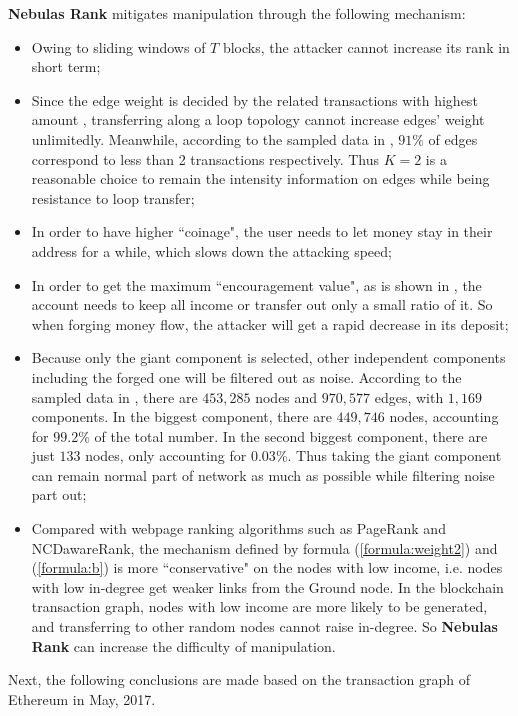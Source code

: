 \textbf{Nebulas Rank} mitigates manipulation through the following mechanism:
\begin{itemize}
	\item Owing to sliding windows of $T$ blocks, the attacker cannot increase its rank in short term;
	\item Since the edge weight is decided by the related transactions with highest amount , transferring along a loop topology cannot increase edges' weight unlimitedly. Meanwhile, according to the sampled data in , $91\%$ of edges correspond to less than 2 transactions respectively. Thus $K=2$ is a reasonable choice to remain the intensity information on edges while being resistance to loop transfer;
	\item In order to have higher ``coinage", the user needs to let money stay in their address for a while, which slows down the attacking speed;
	\item In order to get the maximum ``encouragement value", as is shown in , the account needs to keep all income or transfer out only a small ratio of it. So when forging money flow, the attacker will get a rapid decrease in its deposit;
	\item Because only the giant component is selected, other independent components including the forged one will be filtered out as noise. According to the sampled data in , there are $453,285$ nodes and $970,577$ edges, with $1,169$ components. In the biggest component, there are $449,746$ nodes, accounting for $99.2\%$ of the total number. In the second biggest component, there are just $133$ nodes, only accounting for $0.03\%$. Thus taking the giant component can remain normal part of network as much as possible while filtering noise part out;
	\item Compared with webpage ranking algorithms such as PageRank and NCDawareRank\cite{Nikolakopoulos2013}, the mechanism defined by formula (\ref{formula:weight2}) and (\ref{formula:b}) is more ``conservative" on the nodes with low income, i.e. nodes with low in-degree get weaker links from the Ground node. In the blockchain transaction graph, nodes with low income are more likely to be generated, and transferring to other random nodes cannot raise in-degree. So \textbf{Nebulas Rank} can increase the difficulty of manipulation.
\end{itemize}

Next, the following conclusions are made based on the transaction graph of Ethereum in May, 2017.

